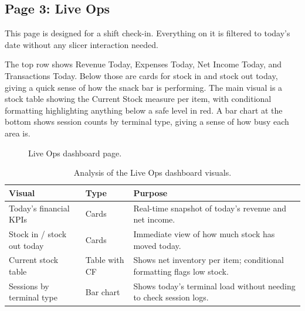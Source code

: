 \documentclass[12pt, a4paper]{report}
\begin{document}
\subsection{Page 3: Live Ops}

This page is designed for a shift check-in. Everything on it is filtered to
today's date without any slicer interaction needed.

The top row shows Revenue Today, Expenses Today, Net Income Today, and Transactions
Today. Below those are cards for stock in and stock out today, giving a quick sense
of how the snack bar is performing. The main visual is a stock table showing the
Current Stock measure per item, with conditional formatting highlighting anything
below a safe level in red. A bar chart at the bottom shows session counts by terminal
type, giving a sense of how busy each area is.

\begin{figure}[H]
  \centering
  \caption{Live Ops dashboard page.\label{fig:dash_liveops}}
\end{figure}

\begin{table}[H]
  \centering
  \caption{Analysis of the Live Ops dashboard visuals.\label{tab:ops_analysis}}
  \begin{tabular}{p{3.5cm} p{2.5cm} p{7cm}}
    \toprule
    \textbf{Visual} & \textbf{Type} & \textbf{Purpose} \\
    \midrule
    Today's financial KPIs
      & Cards
      & Real-time snapshot of today's revenue and net income. \\[4pt]
    Stock in / stock out today
      & Cards
      & Immediate view of how much stock has moved today. \\[4pt]
    Current stock table
      & Table with CF
      & Shows net inventory per item; conditional formatting flags low stock. \\[4pt]
    Sessions by terminal type
      & Bar chart
      & Shows today's terminal load without needing to check session logs. \\
    \bottomrule
  \end{tabular}
\end{table}
\end{document}
